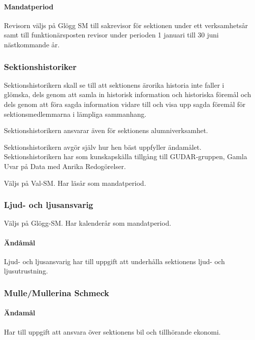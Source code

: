 \documentclass{dgovdoc}
\begin{document}
\paragraph{Mandatperiod}

Revisorn väljs på Glögg SM till sakrevisor för sektionen under ett
verksamhetsår samt till funktionärsposten revisor under perioden 1 januari till
30 juni nästkommande år.

\subsubsection{Sektionshistoriker}

Sektionshistorikern skall se till att sektionens ärorika historia inte faller i glömska, dels genom att samla in historisk information och historiska föremål och dels genom att föra sagda information vidare till och visa upp sagda föremål för sektionsmedlemmarna i lämpliga sammanhang.

Sektionshistorikern ansvarar även för sektionens alumniverksamhet.

Sektionshistorikern avgör själv hur hen bäst uppfyller ändamålet. Sektionshistorikern har som
kunskapskälla tillgång till GUDAR-gruppen, Gamla Uvar på Data med Anrika Redogörelser.

Väljs på Val-SM. Har läsår som mandatperiod.

\subsubsection{Ljud- och ljusansvarig}

Väljs på Glögg-SM. Har kalenderår som mandatperiod.

\paragraph{Ändåmål}

Ljud- och ljusansvarig har till uppgift att underhålla sektionens ljud- och
ljusutrustning.

\subsubsection{Mulle/Mullerina Schmeck}

\paragraph{Ändamål}

Har till uppgift att ansvara över sektionens bil och tillhörande ekonomi.
\end{document}
